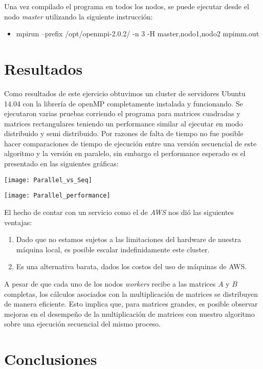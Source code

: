 \documentclass[DIV=calc, paper=letter, fontsize=11pt, twocolumn]{scrartcl}
\begin{document}
Una vez compilado el programa en todos los nodos, se puede ejecutar desde el nodo \textit{master} utilizando la siguiente instrucción:

\begin{itemize}
    \item mpirun --prefix /opt/openmpi-2.0.2/ -n 3 -H master,nodo1,nodo2 mpimm.out
\end{itemize}

\section{Resultados}

Como resultados de este ejercicio obtuvimos un cluster de servidores Ubuntu 14.04 con la librería de openMP completamente instalada y funcionando. Se ejecutaron varias pruebas corriendo el programa para matrices cuadradas y matrices rectangulares teniendo un performance similar al ejecutar en modo distribuido y semi distribuido. Por razones de falta de tiempo no fue posible hacer comparaciones de tiempo de ejecución entre una versión secuencial de este algoritmo y la versión en paralelo, sin embargo el performance esperado es el presentado en las siguientes gráficas:

\texttt{[image: Parallel\_vs\_Seq]}

\texttt{[image: Parallel\_performance]}

El hecho de contar con un servicio como el de \textit{AWS} nos dió las siguientes ventajas:

\begin{enumerate}
    \item Dado que no estamos sujetos a las limitaciones del hardware de nuestra máquina local, es posible escalar indefinidamente este cluster.
    \item Es una alternativa barata, dados los costos del uso de máquinas de AWS.
\end{enumerate}

A pesar de que cada uno de los nodos \textit{workers} recibe a las matrices $A$ y $B$ completas, los cálculos asociados con la multiplicación de matrices se distribuyen de manera eficiente. Esto implica que, para matrices grandes, es posible observar mejoras en el desempeño de la multiplicación de matrices con nuestro algoritmo sobre una ejecución secuencial del mismo proceso.

\section{Conclusiones}
\end{document}
